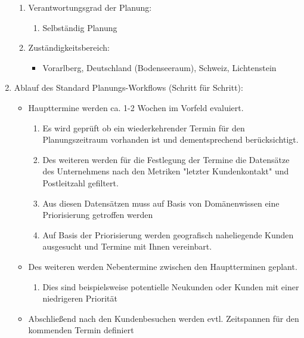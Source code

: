 \documentclass[Bachelorarbeit.tex]{subfiles}
\begin{document}
\begin{enumerate}
\begin{enumerate}
		\item Verantwortungsgrad der Planung:
		\begin{enumerate}
			\item[] Selbständig Planung
		\end{enumerate}
		\item Zuständigkeitsbereich:
		\begin{itemize}
			\item[] Vorarlberg, Deutschland (Bodenseeraum), Schweiz, Lichtenstein
		\end{itemize}
	\end{enumerate}
	\item Ablauf des Standard Planungs-Workflows (Schritt für Schritt):
	\begin{itemize}
		\item[] Haupttermine werden ca. 1-2 Wochen im Vorfeld evaluiert. 
		\begin{enumerate}
			\item Es wird geprüft ob ein wiederkehrender Termin für den Planungszeitraum vorhanden ist und dementsprechend berücksichtigt.
			\item Des weiteren werden für die Festlegung der Termine die Datensätze des Unternehmens nach den Metriken "letzter Kundenkontakt" und Postleitzahl  gefiltert.
			\item Aus diesen Datensätzen muss auf Basis von Domänenwissen eine Priorisierung getroffen werden
			\item Auf Basis der Priorisierung werden geografisch naheliegende Kunden ausgesucht und Termine mit Ihnen vereinbart.
		\end{enumerate}
		\item[] Des weiteren werden Nebentermine zwischen den Hauptterminen geplant.
		\begin{enumerate}
			\item Dies sind beispielsweise potentielle Neukunden oder Kunden mit einer niedrigeren Priorität 
		\end{enumerate}
		\item[] Abschließend nach den Kundenbesuchen werden evtl. Zeitspannen für den kommenden Termin definiert
	\end{itemize}
	

\end{enumerate}
\end{document}
